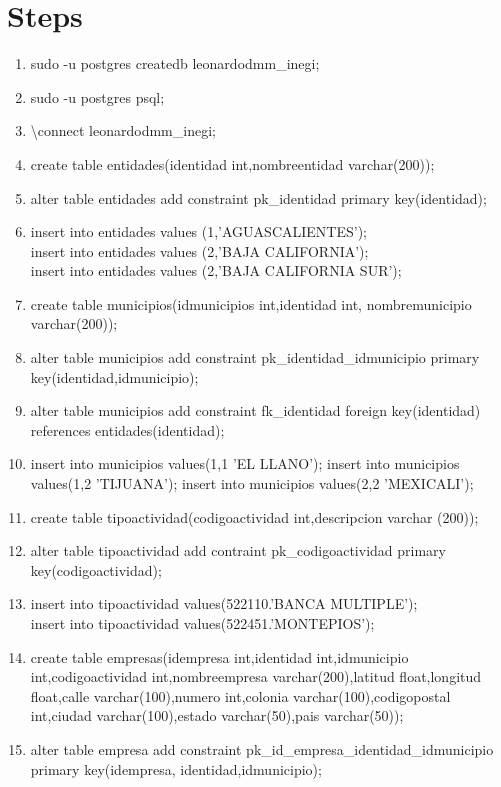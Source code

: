 \documentclass[10pt]{article}         %
\begin{document}
\section{Steps}
\begin{enumerate}

\item
	sudo -u postgres createdb leonardodmm\_inegi;
\item
	sudo -u postgres psql;
\item
	\textbackslash connect leonardodmm\_inegi;
\item
	create table entidades(identidad int,nombreentidad varchar(200));
\item
	alter table entidades add constraint pk\_identidad primary key(identidad);
\item
	insert into entidades values (1,'AGUASCALIENTES');\\
	insert into entidades values (2,'BAJA CALIFORNIA');\\
	insert into entidades values (2,'BAJA CALIFORNIA SUR');
\item
	create table municipios(idmunicipios int,identidad int, nombremunicipio varchar(200));
\item
	alter table municipios add constraint pk\_identidad\_idmunicipio primary key(identidad,idmunicipio);
\item
	alter table municipios add constraint fk\_identidad foreign key(identidad) references entidades(identidad);
\item
	insert into municipios values(1,1 'EL LLANO');
	insert into municipios values(1,2 'TIJUANA');
	insert into municipios values(2,2 'MEXICALI');
\item
	create table tipoactividad(codigoactividad int,descripcion varchar (200));
\item
	alter table tipoactividad add contraint pk\_codigoactividad primary key(codigoactividad);
\item	
	 insert into tipoactividad values(522110.'BANCA MULTIPLE');\\
	 insert into tipoactividad values(522451.'MONTEPIOS');
\item
	create table empresas(idempresa int,identidad int,idmunicipio int,codigoactividad int,nombreempresa varchar(200),latitud float,longitud float,calle varchar(100),numero int,colonia varchar(100),codigopostal int,ciudad varchar(100),estado varchar(50),pais varchar(50));
\item
	alter table empresa add constraint pk\_id\_empresa\_identidad\_idmunicipio primary key(idempresa, identidad,idmunicipio);

\end{enumerate}
\end{document}
